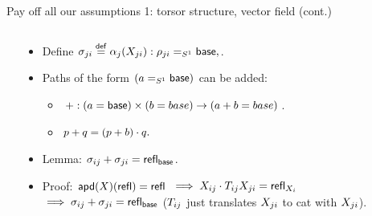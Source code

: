 \begin{frame}{Pay off all our assumptions 1: torsor structure, vector field (cont.)}
\begin{columns}
\begin{column}{0.15\textwidth}

\end{column}
\begin{column}{0.5\textwidth}
\begin{itemize}
\item<2-> Define \( \sigma_{ji}\stackrel{\mathsf{def}}{=} \alpha_j(X_{ji}):\rho_{ji}=_{S^1}\mathsf{base}, \).
\item<3-> Paths of the form \( (a=_{S^1}\mathsf{base}) \) can be added: 
\begin{itemize}
\item \( +:(a=\mathsf{base})\times (b=base)\to (a+ b=base) \).
\item \( p+ q=(p+ b)\cdot q. \)
\end{itemize}
\item<4-> Lemma: \( \sigma_{ij}+\sigma_{ji}=\mathsf{refl}_{\mathsf{base}} \).
\item<5-> Proof: \( \mathsf{apd}(X)(\mathsf{refl})=\mathsf{refl}\) \(\implies X_{ij}\cdot T_{ij}X_{ji}=\mathsf{refl}_{X_i}\) \(\implies\sigma_{ij}+\sigma_{ji}=\mathsf{refl}_{\mathsf{base}} \) (\( T_{ij} \) just translates \( X_{ji} \) to cat with \( X_{ji} \)).
\end{itemize}
\end{column}
\begin{column}{0.35\textwidth}
\end{column}
\end{columns}
\end{frame}

